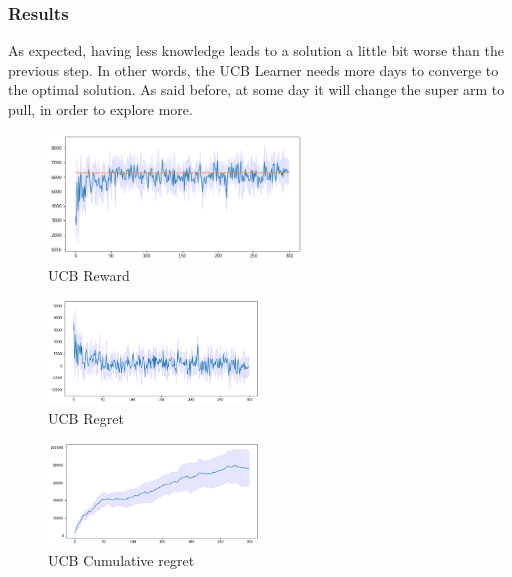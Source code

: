 \subsubsection{Results}
As expected, having less knowledge leads to a solution a little bit worse than the previous step. In other words, the UCB Learner needs more days to converge to the optimal solution. As said before, at some day it will change the super arm to pull, in order to explore more.
\begin{figure}[ht]
    \begin{center}
    \includegraphics[width=0.6\textwidth]{img/UCB4.png}
    \caption{UCB Reward}
    \label{fig:reward41}
    \end{center}
\end{figure}
\begin{multicols}{2}
    \begin{figure}[H]
        \begin{center}
        \includegraphics[width=0.5\textwidth]{img/UCB4_regret.png}
        \caption{UCB Regret}
        \label{fig:regret41}
        \end{center}
    \end{figure}
    \columnbreak
    \begin{figure}[H]
        \begin{center}
        \includegraphics[width=0.5\textwidth]{img/UCB4_cum_reg.png}
        \caption{UCB Cumulative regret}
        \label{fig:cum_reg41}
        \end{center}
    \end{figure}
\end{multicols}

